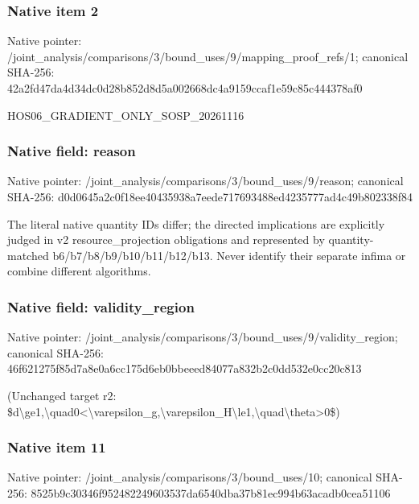 \documentclass[10pt,a4paper]{article}
\begin{document}
\subsubsection{Native item 2}
Native pointer: /joint\_\allowbreak{}analysis/comparisons/3/bound\_\allowbreak{}uses/9/mapping\_\allowbreak{}proof\_\allowbreak{}refs/1; canonical SHA-256: 42a2fd47da4d34dc0d28b852d8d5a002668dc4a9159ccaf1e59c85c444378af0

\begingroup\raggedright\sloppy HOS06\_\allowbreak{}GRADIENT\_\allowbreak{}ONLY\_\allowbreak{}SOSP\_\allowbreak{}20261116\par\endgroup

\subsubsection{Native field: reason}
Native pointer: /joint\_\allowbreak{}analysis/comparisons/3/bound\_\allowbreak{}uses/9/reason; canonical SHA-256: d0d0645a2c0f18ee40435938a7eede717693488ed4235777ad4c49b802338f84

\begingroup\raggedright\sloppy The literal native quantity IDs differ;\allowbreak{} the directed implications are explicitly judged in v2 resource\_\allowbreak{}projection obligations and represented by quantity-matched b6/\allowbreak{}b7/\allowbreak{}b8/\allowbreak{}b9/\allowbreak{}b10/\allowbreak{}b11/\allowbreak{}b12/\allowbreak{}b13. Never identify their separate infima or combine different algorithms.\par\endgroup

\subsubsection{Native field: validity\_\allowbreak{}region}
Native pointer: /joint\_\allowbreak{}analysis/comparisons/3/bound\_\allowbreak{}uses/9/validity\_\allowbreak{}region; canonical SHA-256: 46f621275f85d7a8e0a6cc175d6eb0bbeeed84077a832b2c0dd532e0cc20c813

\begingroup\raggedright\sloppy (Unchanged target r2:\allowbreak{} \$d\textbackslash{}ge1,\allowbreak{}\textbackslash{}quad0<\textbackslash{}varepsilon\_\allowbreak{}g,\allowbreak{}\textbackslash{}varepsilon\_\allowbreak{}H\textbackslash{}le1,\allowbreak{}\textbackslash{}quad\textbackslash{}theta>0\$)\par\endgroup

\subsubsection{Native item 11}
Native pointer: /joint\_\allowbreak{}analysis/comparisons/3/bound\_\allowbreak{}uses/10; canonical SHA-256: 8525b9c30346f952482249603537da6540dba37b81ec994b63acadb0cea51106
\end{document}
